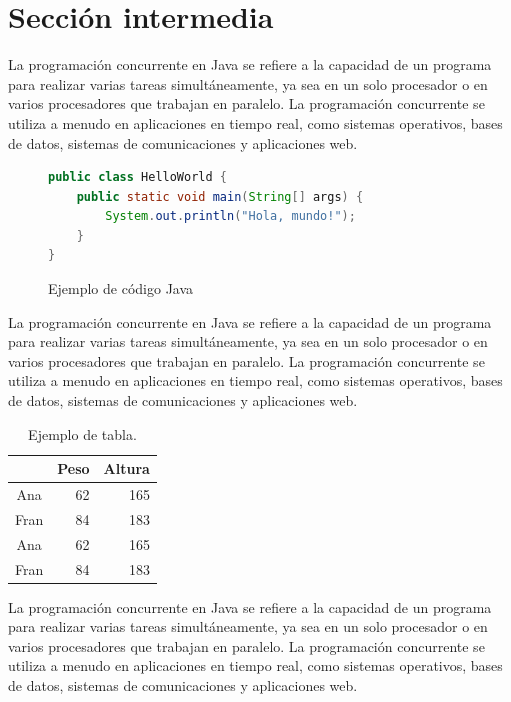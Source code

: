 \section{Sección intermedia}

La programación concurrente en Java se refiere a la capacidad de un programa para realizar varias tareas simultáneamente, ya sea en un solo procesador o en varios procesadores que trabajan en paralelo. La programación concurrente se utiliza a menudo en aplicaciones en tiempo real, como sistemas operativos, bases de datos, sistemas de comunicaciones y aplicaciones web.

\begin{figure}[h]
	\centering
	\begin{lstlisting}[language=Java, style=ColorStyle]
public class HelloWorld {
	public static void main(String[] args) {
		System.out.println("Hola, mundo!"); 
	}
}
	\end{lstlisting}
	\caption{Ejemplo de código Java}
	\label{fig:ejemplo-java}
\end{figure}

La programación concurrente en Java se refiere a la capacidad de un programa para realizar varias tareas simultáneamente, ya sea en un solo procesador o en varios procesadores que trabajan en paralelo. La programación concurrente se utiliza a menudo en aplicaciones en tiempo real, como sistemas operativos, bases de datos, sistemas de comunicaciones y aplicaciones web.

\begin{table}
	\begin{center}
		\begin{tabular}{c r r}
			\hline
			& Peso & Altura \\
			\hline
			Ana & 62 & 165 \\
			Fran & 84 & 183 \\
			Ana & 62 & 165 \\
			Fran & 84 & 183 \\
			\hline
		\end{tabular}
		\caption{Ejemplo de tabla.}
		\label{demo-table}
	\end{center}
\end{table}

La programación concurrente en Java se refiere a la capacidad de un programa para realizar varias tareas simultáneamente, ya sea en un solo procesador o en varios procesadores que trabajan en paralelo. La programación concurrente se utiliza a menudo en aplicaciones en tiempo real, como sistemas operativos, bases de datos, sistemas de comunicaciones y aplicaciones web.

